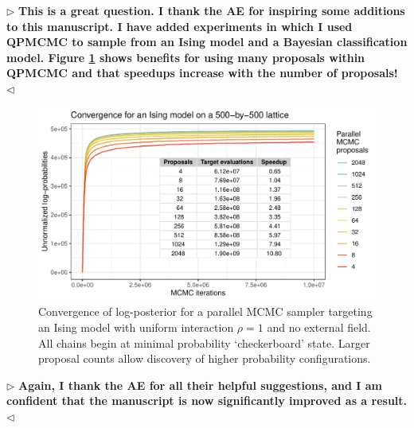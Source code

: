 \documentclass[12pt]{article}
\newenvironment{reply}{$\triangleright$\bfseries}{$\triangleleft$}
\begin{document}
\begin{reply}
	This is a great question. I thank the AE for inspiring some additions to this manuscript.  I have added experiments in which I used QPMCMC to sample from an Ising model and a Bayesian classification model.  Figure \ref{fig:ising2d} shows benefits for using many proposals within QPMCMC and that speedups increase with the number of proposals!
\end{reply}

\setcounter{figure}{6}
 \begin{figure}[!t]
	\centering
	\includegraphics[width=0.7\linewidth]{figures/Ising2dFig.pdf}
	\caption{Convergence of log-posterior for a parallel MCMC sampler targeting an Ising model with uniform interaction $\rho=1$ and no external field. All chains begin at minimal probability `checkerboard' state. Larger proposal counts allow discovery of higher probability configurations.}\label{fig:ising2d}
\end{figure}

\begin{reply}
	Again, I thank the AE for all their helpful suggestions, and I am confident that the manuscript is now significantly improved as a result.
\end{reply}
\end{document}
